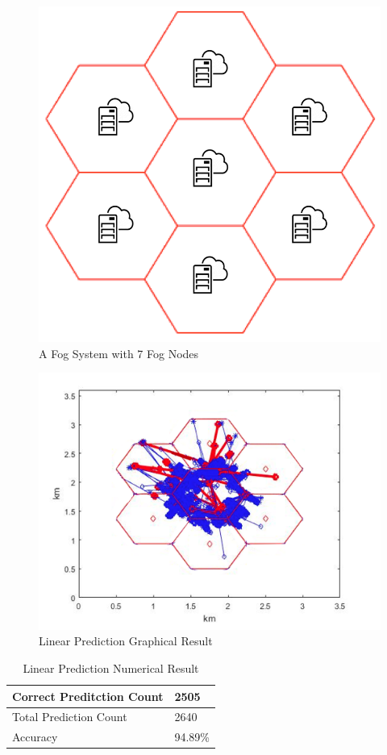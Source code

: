 \begin{figure}[ht!]
\centering
\includegraphics[width=0.5\linewidth]{images/car_7}
\caption{A Fog System with 7 Fog Nodes}
\label{car7}
\end{figure}


\begin{figure}[ht!]
\centering
\includegraphics[width=1\linewidth]{images/car_res}
\caption{Linear Prediction Graphical Result}
\label{RomeRes}
\end{figure}


\begin{table}[h]
\caption{Linear Prediction Numerical Result}
\centering
\begin{tabular}{|m{4cm}|m{2cm}|}
	\hline
	Correct Preditction Count & 2505 \\ 
	\hline
	Total Prediction Count & 2640 \\ 
	\hline
	Accuracy & 94.89\% \\ \hline
\end{tabular}
\label{cartable}
\end{table}



















